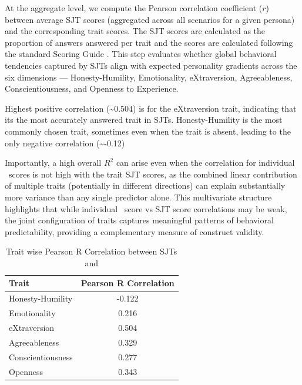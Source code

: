 At the aggregate level, we compute the Pearson correlation coefficient ($r$) between average SJT scores (aggregated across all scenarios for a given persona) and the corresponding \hexaco\;  trait scores. The SJT scores are calculated as the proportion of answers answered per trait and the \hexaco\;  scores are calculated following the standard \hexaco\;  Scoring Guide \citep{lee2018psychometric}. This step evaluates whether global behavioral tendencies captured by SJTs align with expected personality gradients across the six \hexaco\;  dimensions — \textcolor{hexH}{Honesty-Humility}, \textcolor{hexE}{Emotionality}, \textcolor{hexX}{eXtraversion}, \textcolor{hexA}{Agreeableness}, \textcolor{hexC}{Conscientiousness}, and \textcolor{hexO}{Openness to Experience}.

Highest positive correlation (\textasciitilde 0.504) is for the \textcolor{hexX}{eXtraversion} trait, indicating that its the most accurately answered trait in SJTs. \textcolor{hexH}{Honesty-Humility} is the most commonly chosen trait, sometimes even when the trait is absent, leading to the only negative correlation (\textasciitilde -0.12)

Importantly, a high overall $R^2$ can arise even when the correlation for individual \hexaco\ scores is not high with the trait SJT scores, as the combined linear contribution of multiple traits (potentially in different directions) can explain substantially more variance than any single predictor alone. This multivariate structure highlights that while individual \hexaco\ score vs SJT score correlations may be weak, the joint configuration of traits captures meaningful patterns of behavioral predictability, providing a complementary measure of construct validity.

\begin{table}[H]
\centering
\caption{Trait wise Pearson R Correlation between SJTs and \hexaco\; }
\begin{tabularx}{\columnwidth}{|X|c|}
\hline
\textbf{Trait} & \textbf{Pearson R Correlation} \\
\hline
\textcolor{hexH}{Honesty-Humility} & -0.122 \\
\hline
\textcolor{hexE}{Emotionality}  & 0.216 \\
\hline
\textcolor{hexX}{eXtraversion} & 0.504 \\
\hline
\textcolor{hexA}{Agreeableness} & 0.329 \\
\hline
\textcolor{hexC}{Conscientiousness} & 0.277 \\
\hline
\textcolor{hexO}{Openness} & 0.343 \\
\hline
\end{tabularx}
\end{table}


